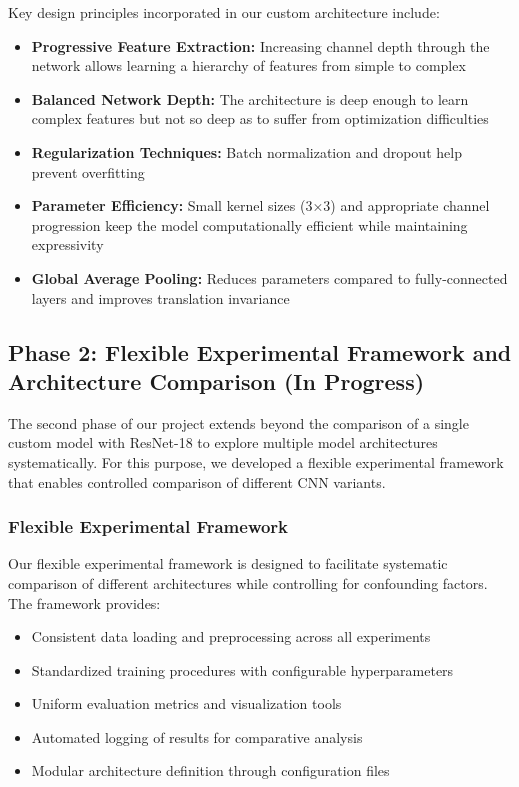 Key design principles incorporated in our custom architecture include:
\begin{itemize}
    \item \textbf{Progressive Feature Extraction:} Increasing channel depth through the network allows learning a hierarchy of features from simple to complex
    \item \textbf{Balanced Network Depth:} The architecture is deep enough to learn complex features but not so deep as to suffer from optimization difficulties
    \item \textbf{Regularization Techniques:} Batch normalization and dropout help prevent overfitting
    \item \textbf{Parameter Efficiency:} Small kernel sizes (3×3) and appropriate channel progression keep the model computationally efficient while maintaining expressivity
    \item \textbf{Global Average Pooling:} Reduces parameters compared to fully-connected layers and improves translation invariance
\end{itemize}


\subsection{Phase 2: Flexible Experimental Framework and Architecture Comparison (In Progress)}
The second phase of our project extends beyond the comparison of a single custom model with ResNet-18 to explore multiple model architectures systematically. For this purpose, we developed a flexible experimental framework that enables controlled comparison of different CNN variants.

\subsubsection{Flexible Experimental Framework}
Our flexible experimental framework is designed to facilitate systematic comparison of different architectures while controlling for confounding factors. The framework provides:
\begin{itemize}
    \item Consistent data loading and preprocessing across all experiments
    \item Standardized training procedures with configurable hyperparameters
    \item Uniform evaluation metrics and visualization tools
    \item Automated logging of results for comparative analysis
    \item Modular architecture definition through configuration files
\end{itemize}

